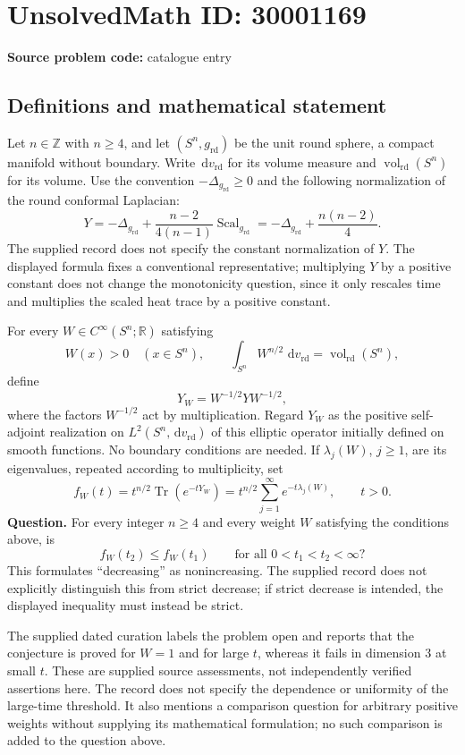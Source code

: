 \documentclass[11pt]{article}
\newcommand{\Z}{\mathbb{Z}}
\newcommand{\R}{\mathbb{R}}
\newcommand{\dd}{\,\mathrm{d}}
\begin{document}
\section*{UnsolvedMath ID: 30001169}
\textbf{Source problem code:} catalogue entry
\subsection{Definitions and mathematical statement}
Let \(n\in\Z\) with \(n\geq4\), and let \((S^n,g_{\mathrm{rd}})\) be the unit round sphere, a compact manifold without boundary. Write \(\dd v_{\mathrm{rd}}\) for its volume measure and \(\operatorname{vol}_{\mathrm{rd}}(S^n)\) for its volume. Use the convention \(-\Delta_{g_{\mathrm{rd}}}\geq0\) and the following normalization of the round conformal Laplacian:
\[
Y=-\Delta_{g_{\mathrm{rd}}}+\frac{n-2}{4(n-1)}\operatorname{Scal}_{g_{\mathrm{rd}}}
 =-\Delta_{g_{\mathrm{rd}}}+\frac{n(n-2)}4.
\]
The supplied record does not specify the constant normalization of \(Y\). The displayed formula fixes a conventional representative; multiplying \(Y\) by a positive constant does not change the monotonicity question, since it only rescales time and multiplies the scaled heat trace by a positive constant.

For every \(W\in C^\infty(S^n;\R)\) satisfying
\[
W(x)>0\quad(x\in S^n),\qquad
\int_{S^n}W^{n/2}\,\dd v_{\mathrm{rd}}
 =\operatorname{vol}_{\mathrm{rd}}(S^n),
\]
define
\[
Y_W=W^{-1/2}YW^{-1/2},
\]
where the factors \(W^{-1/2}\) act by multiplication. Regard \(Y_W\) as the positive self-adjoint realization on \(L^2(S^n,\dd v_{\mathrm{rd}})\) of this elliptic operator initially defined on smooth functions. No boundary conditions are needed. If \(\lambda_j(W)\), \(j\geq1\), are its eigenvalues, repeated according to multiplicity, set
\[
f_W(t)=t^{n/2}\operatorname{Tr}(e^{-tY_W})
      =t^{n/2}\sum_{j=1}^{\infty}e^{-t\lambda_j(W)},
\qquad t>0.
\]
\textbf{Question.} For every integer \(n\geq4\) and every weight \(W\) satisfying the conditions above, is
\[
f_W(t_2)\leq f_W(t_1)
\qquad\text{for all }0<t_1<t_2<\infty?
\]
This formulates ``decreasing'' as nonincreasing. The supplied record does not explicitly distinguish this from strict decrease; if strict decrease is intended, the displayed inequality must instead be strict.

The supplied dated curation labels the problem open and reports that the conjecture is proved for \(W=1\) and for large \(t\), whereas it fails in dimension \(3\) at small \(t\). These are supplied source assessments, not independently verified assertions here. The record does not specify the dependence or uniformity of the large-time threshold. It also mentions a comparison question for arbitrary positive weights without supplying its mathematical formulation; no such comparison is added to the question above.
\end{document}
